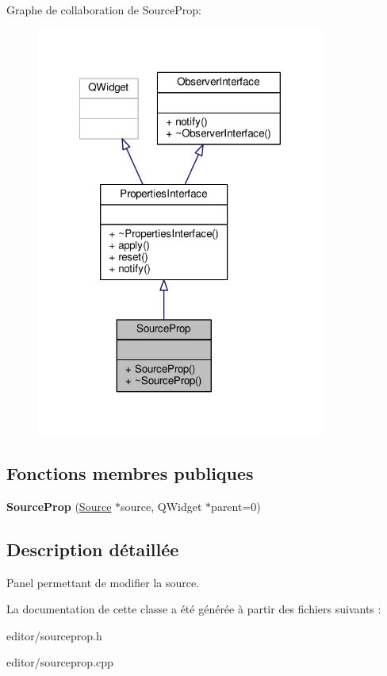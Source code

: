Graphe de collaboration de Source\+Prop\+:\nopagebreak
\begin{figure}[H]
\begin{center}
\leavevmode
\includegraphics[width=269pt]{d0/d35/classSourceProp__coll__graph}
\end{center}
\end{figure}
\subsection*{Fonctions membres publiques}
\begin{DoxyCompactItemize}
\item 
\hypertarget{classSourceProp_ae2499296312b5f80c8dac887fa36008e}{{\bfseries Source\+Prop} (\hyperlink{classSource}{Source} $\ast$source, Q\+Widget $\ast$parent=0)}\label{classSourceProp_ae2499296312b5f80c8dac887fa36008e}

\end{DoxyCompactItemize}


\subsection{Description détaillée}
Panel permettant de modifier la source. 

La documentation de cette classe a été générée à partir des fichiers suivants \+:\begin{DoxyCompactItemize}
\item 
editor/sourceprop.\+h\item 
editor/sourceprop.\+cpp\end{DoxyCompactItemize}
